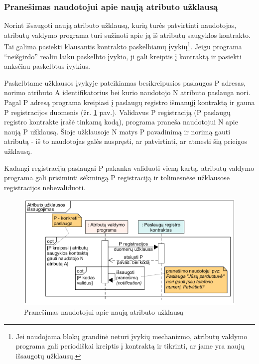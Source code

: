 \subsubsection{Pranešimas naudotojui apie naują atributo užklausą} \label{BCIDM:blockchainMonitoring}

Norint išsaugoti naują atributo užklausą, kurią turės patvirtinti naudotojas, atributų valdymo programa turi sužinoti
apie ją iš atributų saugyklos kontrakto. Tai galima pasiekti klausantis kontrakto paskelbiamų įvykių\footnote{ Jei naudojama blokų grandinė
neturi įvykių mechanizmo, atributų valdymo programa gali periodiškai kreiptis į kontraktą ir tikrinti, ar jame yra naujų išsaugotų užklausų.}. Jeigu programa \enquote{neišgirdo}
realiu laiku paskelbto įvykio, ji gali kreiptis į kontraktą ir pasiekti anksčiau paskelbtus įvykius.

Paskelbtame užklausos įvykyje pateikiamas besikreipusios paslaugos P adresas, norimo atributo A
identifikatorius bei kurio naudotojo N atributo paslauga nori. Pagal P adresą programa kreipiasi
į paslaugų registro išmanųjį kontraktą ir gauna P registracijos duomenis (žr. \hypertarget{fig:checkForPendingPermissions}{\ref{fig:checkForPendingPermissions}} pav.).
Validavus P registraciją (P paslaugų registro
kontrakte įrašė tinkamą kodą), programa praneša naudotojui N apie naują P užklausą. Šioje užklausoje N
matys P pavadinimą ir norimą gauti atributą - iš to naudotojas galės nuspręsti, ar patvirtinti, ar atmesti šią prieigos užklausą.

Kadangi registraciją paslaugai P pakanka validuoti vieną kartą, atributų valdymo programa gali prisiminti sėkmingą P registraciją
ir tolimesnėse užklausose registracijos nebevaliduoti.

\begin{figure}[H]
    \centering
    \includegraphics[scale=0.9]{img/checkForPendingPermissions}
    \caption{Pranešimas naudotojui apie naują atributo užklausą}
    \label{fig:checkForPendingPermissions}
\end{figure}